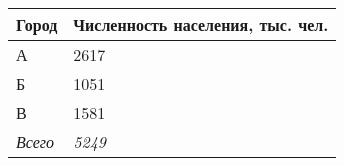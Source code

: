 \documentclass{article}
\begin{document}
\begin{minipage}{\textwidth}
\centering
\begin{tabularx}{0.4\textwidth}{YY}
\toprule
\textbf{Город} & \textbf{Численность населения, тыс. чел.} \\
\midrule
А & 2617 \\

Б & 1051 \\

В & 1581 \\
\addlinespace
\textit{Всего} & \textit{5249} \\
\bottomrule
\end{tabularx}
\label{task8}
\end{minipage} \\[35pt]
\end{document}
